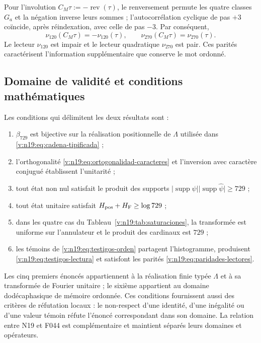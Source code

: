 Pour l’involution \(C_M\tau:=-\operatorname{rev}(\tau)\), le renversement
permute les quatre classes \(G_a\) et la négation inverse leurs sommes ;
l’autocorrélation cyclique de pas \(+3\) coïncide, après réindexation, avec
celle de pas \(-3\). Par conséquent,
\begin{equation}
 \nu_{120}(C_M\tau)=-\nu_{120}(\tau),\qquad
 \nu_{270}(C_M\tau)=\nu_{270}(\tau).
 \label{v:n19:eq:paridades-lectores}
\end{equation}
Le lecteur \(\nu_{120}\) est impair et le lecteur quadratique \(\nu_{270}\) est
pair. Ces parités caractérisent l’information supplémentaire que conserve
le mot ordonné.

\subsection{Domaine de validité et conditions mathématiques}
\label{v:n19:sec:falsadores}

Les conditions qui délimitent les deux résultats sont :
\begin{enumerate}
 \item \(\beta_{729}\) est bijective sur la réalisation positionnelle de
 \(\Lambda\) utilisée dans \eqref{v:n19:eq:cadena-tipificada} ;
 \item l’orthogonalité \eqref{v:n19:eq:ortogonalidad-caracteres} et
 l’inversion avec caractère conjugué établissent l’unitarité ;
 \item tout état non nul satisfait le produit des supports
 \(\lvert\operatorname{supp}\psi\rvert
 \lvert\operatorname{supp}\widehat\psi\rvert\ge729\) ;
 \item tout état unitaire satisfait
 \(H_{\rm pos}+H_{\rm F}\ge\log729\) ;
 \item dans les quatre cas du
 Tableau~\ref{v:n19:tab:saturaciones}, la transformée est uniforme sur
 l’annulateur et le produit des cardinaux est \(729\) ;
 \item les témoins de \eqref{v:n19:eq:testigos-orden} partagent
 l’histogramme, produisent \eqref{v:n19:eq:testigos-lectura} et satisfont les
 parités \eqref{v:n19:eq:paridades-lectores}.
\end{enumerate}
Les cinq premiers énoncés appartiennent à la réalisation finie typée
\(\Lambda\) et à sa transformée de Fourier unitaire ; le sixième appartient au domaine
dodécaphasique de mémoire ordonnée. Ces conditions fournissent aussi
des critères de réfutation locaux : le non-respect d’une identité, d’une inégalité ou d’une
valeur témoin réfute l’énoncé correspondant dans son domaine. La
relation entre N19 et F044 est complémentaire et maintient séparés leurs
domaines et opérateurs.
